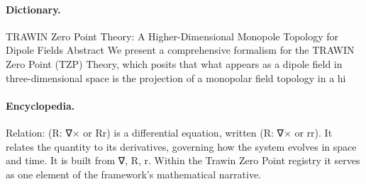 \paragraph{Dictionary.}
TRAWIN Zero Point Theory: A Higher-Dimensional Monopole Topology for Dipole Fields Abstract We present a comprehensive formalism for the TRAWIN Zero Point (TZP) Theory, which posits that what appears as a dipole field in three-dimensional space is the projection of a monopolar field topology in a hi

\paragraph{Encyclopedia.}
Relation: (R: ∇× or Rr) is a differential equation, written (R: ∇× or rr). It relates the quantity to its derivatives, governing how the system evolves in space and time. It is built from ∇, R, r. Within the Trawin Zero Point registry it serves as one element of the framework's mathematical narrative.
